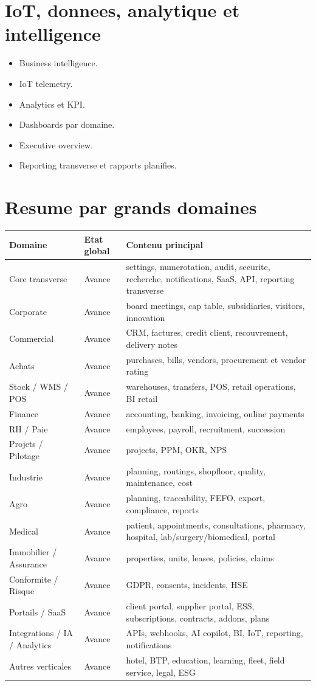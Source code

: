 \documentclass[11pt,a4paper]{article}
\begin{document}
\section{IoT, donnees, analytique et intelligence}
\begin{itemize}[leftmargin=1.2cm]
    \item Business intelligence.
    \item IoT telemetry.
    \item Analytics et KPI.
    \item Dashboards par domaine.
    \item Executive overview.
    \item Reporting transverse et rapports planifies.
\end{itemize}

\section{Resume par grands domaines}
\begin{longtable}{p{4.2cm}p{4cm}p{6.5cm}}
\toprule
\textbf{Domaine} & \textbf{Etat global} & \textbf{Contenu principal} \\
\midrule
Core transverse & Avance & settings, numerotation, audit, securite, recherche, notifications, SaaS, API, reporting transverse \\
Corporate & Avance & board meetings, cap table, subsidiaries, visitors, innovation \\
Commercial & Avance & CRM, factures, credit client, recouvrement, delivery notes \\
Achats & Avance & purchases, bills, vendors, procurement et vendor rating \\
Stock / WMS / POS & Avance & warehouses, transfers, POS, retail operations, BI retail \\
Finance & Avance & accounting, banking, invoicing, online payments \\
RH / Paie & Avance & employees, payroll, recruitment, succession \\
Projets / Pilotage & Avance & projects, PPM, OKR, NPS \\
Industrie & Avance & planning, routings, shopfloor, quality, maintenance, cost \\
Agro & Avance & planning, traceability, FEFO, export, compliance, reports \\
Medical & Avance & patient, appointments, consultations, pharmacy, hospital, lab/surgery/biomedical, portal \\
Immobilier / Assurance & Avance & properties, units, leases, policies, claims \\
Conformite / Risque & Avance & GDPR, consents, incidents, HSE \\
Portails / SaaS & Avance & client portal, supplier portal, ESS, subscriptions, contracts, addons, plans \\
Integrations / IA / Analytics & Avance & APIs, webhooks, AI copilot, BI, IoT, reporting, notifications \\
Autres verticales & Avance & hotel, BTP, education, learning, fleet, field service, legal, ESG \\
\bottomrule
\end{longtable}
\end{document}
